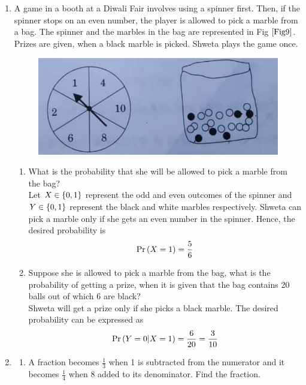 \documentclass[journal,12pt,twocolumn]{IEEEtran}
\begin{document}
\begin{enumerate}[label=4.\arabic*]
    \item A game in a booth at a Diwali Fair involves using a spinner first. Then, if the spinner stops on an even number, the player is allowed to pick a marble from a bag. The spinner and the marbles in the bag are represented in Fig $\ref{Fig9}$.\\
    Prizes are given, when a black marble is picked. Shweta plays the game once.
    \begin{figure}[h!]
        \centering
        \includegraphics[width=0.5\columnwidth]{Fig9.png}
	    \caption{}
	    \label{Fig9}
    \end{figure} 
    \begin{enumerate}
        \item What is the probability that she will be allowed to pick a marble from the bag?\\
		\solution Let $X\in \left\{0,1\right\}$ represent the odd and even outcomes of the spinner and $Y \in \left\{0,1\right\}$ represent the black and white marbles respectively.  Shweta can pick a marble only if she gets an even number in the spinner.  Hence, the desired probability is 
		    \begin{align}
			    \Pr\left(X = 1\right) = \frac{5}{6}
		    \end{align}
        \item Suppose she is allowed to pick a marble from the bag, what is the probability of getting a prize, when it is given that the bag contains 20 balls out of which 6 are black?\\
		\solution Shweta will get a prize only if she picks a black marble.  The desired probability can be expressed as 
		    \begin{align}
			    \Pr\left(Y = 0 | X = 1\right) = \frac{6}{20} = \frac{3}{10}
		    \end{align}
    \end{enumerate}
    \item \begin{enumerate}
        \item A fraction becomes $\frac{1}{3}$ when 1 is subtracted from the numerator and it becomes $\frac{1}{4}$ when 8 added to its denominator. Find the fraction.\\

\end{enumerate}
\end{enumerate}
\end{document}
